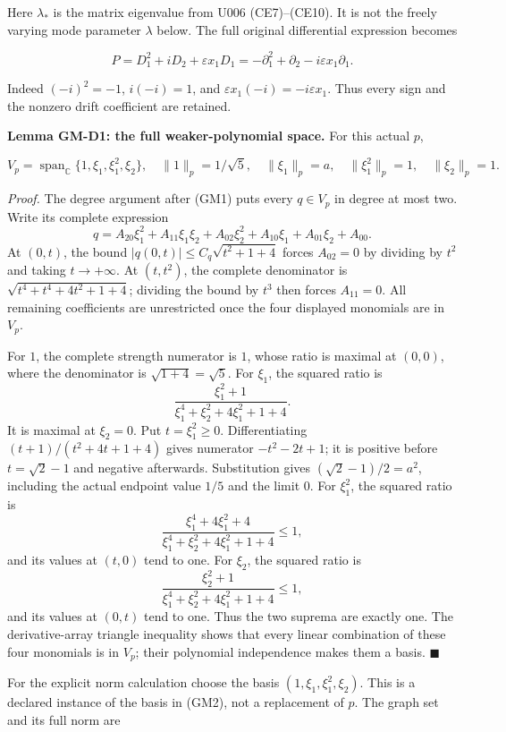 \documentclass[
  11pt,
]{article}
\begin{document}
Here \(\lambda_*\) is the matrix eigenvalue from U006
(CE7)--(CE10). It is not the freely varying mode parameter
\(\lambda\) below. The full original differential
expression becomes

\[
 P=D_1^2+iD_2+\varepsilon x_1D_1
  =-\partial_1^2+\partial_2-i\varepsilon x_1\partial_1.
 \tag{GM30}
\]

Indeed \((-i)^2=-1\), \(i(-i)=1\), and
\(\varepsilon x_1(-i)=-i\varepsilon x_1\). Thus every sign and the nonzero drift
coefficient are retained.

\textbf{Lemma GM-D1: the full weaker-polynomial space.} For this actual
\(p\),

\[
 V_p=\operatorname{span}_{\mathbb C}\{1,\xi_1,\xi_1^2,\xi_2\},
 \quad
 \|1\|_p=1/\sqrt5,
 \quad\|\xi_1\|_p=a,
 \quad\|\xi_1^2\|_p=1,
 \quad\|\xi_2\|_p=1.
 \tag{GM31}
\]

\emph{Proof.} The degree argument after (GM1) puts every
\(q\in V_p\) in degree at most two. Write its complete
expression \[
 q=A_{20}\xi_1^2+A_{11}\xi_1\xi_2+A_{02}\xi_2^2
       +A_{10}\xi_1+A_{01}\xi_2+A_{00}.
\] At \((0,t)\), the
bound \(|q(0,t)|\leq C_q\sqrt{t^2+1+4}\) forces \(A_{02}=0\) by
dividing by \(t^2\) and taking
\(t\to+\infty\). At \((t,t^2)\), the complete
denominator is \(\sqrt{t^4+t^4+4t^2+1+4}\); dividing the bound by
\(t^3\) then forces \(A_{11}=0\). All
remaining coefficients are unrestricted once the four displayed
monomials are in \(V_p\).

For \(1\), the complete strength numerator is
\(1\), whose ratio is maximal at
\((0,0)\), where the denominator is
\(\sqrt{1+4}=\sqrt5\). For \(\xi_1\), the squared
ratio is \[
 \frac{\xi_1^2+1}{\xi_1^4+\xi_2^2+4\xi_1^2+1+4}.
\] It is maximal at
\(\xi_2=0\). Put \(t=\xi_1^2\geq0\).
Differentiating \((t+1)/(t^2+4t+1+4)\) gives numerator
\(-t^2-2t+1\); it is positive before
\(t=\sqrt2-1\) and negative afterwards. Substitution gives
\((\sqrt2-1)/2=a^2\), including the actual endpoint value
\(1/5\) and the limit \(0\). For
\(\xi_1^2\), the squared ratio is
\[
 \frac{\xi_1^4+4\xi_1^2+4}{\xi_1^4+\xi_2^2+4\xi_1^2+1+4}\leq1,
\] and its values at \((t,0)\)
tend to one. For \(\xi_2\), the squared ratio is
\[
 \frac{\xi_2^2+1}{\xi_1^4+\xi_2^2+4\xi_1^2+1+4}\leq1,
\] and its values at \((0,t)\)
tend to one. Thus the two suprema are exactly one. The derivative-array
triangle inequality shows that every linear combination of these four
monomials is in \(V_p\); their polynomial
independence makes them a basis. \hfill\ensuremath{\blacksquare}

For the explicit norm calculation choose the basis
\((1,\xi_1,\xi_1^2,\xi_2)\). This is a declared instance of the basis in
(GM2), not a replacement of \(p\). The graph set
and its full norm are
\end{document}
